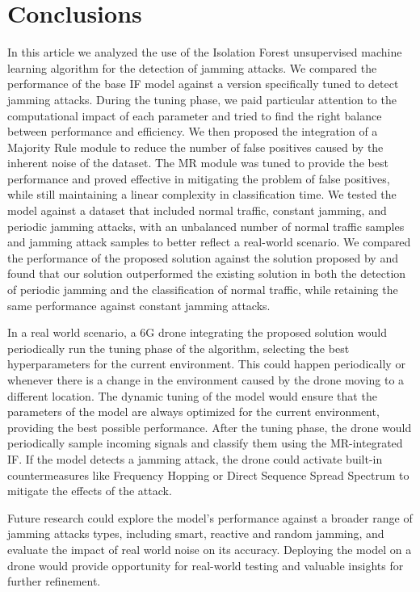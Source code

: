 \documentclass[futureinternet,article,submit,pdftex,moreauthors]{Definitions/mdpi}
\begin{document}
\section{Conclusions}

In this article we analyzed the use of the Isolation Forest unsupervised machine learning algorithm for the detection of jamming attacks. We compared the performance of the base IF model against a version specifically tuned to detect jamming attacks. During the tuning phase, we paid particular attention to the computational impact of each parameter and tried to find the right balance between performance and efficiency. 
We then proposed the integration of a Majority Rule module to reduce the number of false positives caused by the inherent noise of the dataset. The MR module was tuned to provide the best performance and proved effective in mitigating the problem of false positives, while still maintaining a linear complexity in classification time.
We tested the model against a dataset that included normal traffic, constant jamming, and periodic jamming attacks, with an unbalanced number of normal traffic samples and jamming attack samples to better reflect a real-world scenario.
We compared the performance of the proposed solution against the solution proposed by \cite{JammingDetectionIoT-Hussain} and found that our solution outperformed the existing solution in both the detection of periodic jamming and the classification of normal traffic, while retaining the same performance against constant jamming attacks.


In a real world scenario, a 6G drone integrating the proposed solution would periodically run the tuning phase of the algorithm, selecting the best hyperparameters for the current environment. This could happen periodically or whenever there is a change in the environment caused by the drone moving to a different location. 
The dynamic tuning of the model would ensure that the parameters of the model are always optimized for the current environment, providing the best possible performance.
After the tuning phase, the drone would periodically sample incoming signals and classify them using the MR-integrated IF. If the model detects a jamming attack, the drone could activate built-in countermeasures like Frequency Hopping or Direct Sequence Spread Spectrum  to mitigate the effects of the attack. 

Future research could explore the model's performance against a broader range of jamming attacks types, including smart, reactive and random jamming, and evaluate the impact of real world noise on its accuracy.
Deploying the model on a drone would provide opportunity for real-world testing and valuable insights for further refinement.
\end{document}
